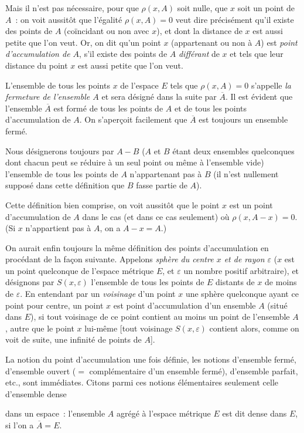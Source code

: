 \documentclass[a4paper,12pt]{amsart}
\newcommand{\srcpage}[1]{} %
\begin{document}
Mais il n'est pas nécessaire, pour que $\rho(x,A)$ soit nulle, que $x$ soit un point de $A$~: on voit aussitôt que l'égalité $\rho(x,A)=0$ veut dire précisément qu'il existe des points de $A$ (coïncidant ou non avec $x$), et dont la distance de $x$ est aussi petite que l'on veut. Or, on dit qu'un point $x$ (appartenant ou non à $A$) est \textit{point d'accumulation de $A$}, s'il existe des points de $A$ \textit{différant} de $x$ et tels que leur distance du point $x$ est aussi petite que l'on veut.

L'ensemble de tous les points $x$ de l'espace $E$ tels que $\rho(x,A)=0$ s'appelle \textit{la fermeture de l'ensemble $A$} et sera désigné dans la suite par $\overline{A}$. Il est évident que l'ensemble $\overline{A}$ est formé de tous les points de $A$ et de tous les points d'accumulation de $A$. On s'aperçoit facilement que $\overline{A}$ est toujours un ensemble fermé.

Nous désignerons toujours par $A-B$ ($A$ et $B$ étant deux ensembles quelconques dont chacun peut se réduire à un seul point ou même à l'ensemble vide) l'ensemble de tous les points de $A$ n'appartenant pas à $B$ (il n'est nullement supposé dans cette définition que $B$ fasse partie de $A$).

Cette définition bien comprise, on voit aussitôt que le point $x$ est un point d'accumulation de $A$ dans le cas (et dans ce cas seulement) où $\rho(x,A-x)=0$. (Si $x$ n'appartient pas à $A$, on a $A-x=A$.)

On aurait enfin toujours la même définition des points d'accumulation en procédant de la façon suivante. Appelons \textit{sphère du centre $x$ et de rayon $\varepsilon$} ($x$ est un point quelconque de l'espace métrique $E$, et $\varepsilon$ un nombre positif arbitraire), et désignons par $S(x,\varepsilon)$ l'ensemble de tous les points de $E$ distants de $x$ de moins de $\varepsilon$. En entendant par un \textit{voisinage} d'un point $x$ une sphère quelconque ayant ce point pour centre, un point $x$ est point d'accumulation d'un ensemble $A$ (situé dans $E$), si tout voisinage de ce point contient au moins un point de l'ensemble $A$, autre que le point $x$ lui-même [tout voisinage $S(x,\varepsilon)$ contient alors, comme on voit de suite, une infinité de points de $A$].

La notion du point d'accumulation une fois définie, les notions d'ensemble fermé, d'ensemble ouvert ($=$ complémentaire d'un ensemble fermé), d'ensemble parfait, etc., sont immédiates. Citons parmi ces notions élémentaires seulement celle d'ensemble dense
\srcpage{45}
dans un espace~: l'ensemble $A$ agrégé à l'espace métrique $E$ est dit dense dans $E$, si l'on a $\overline{A}=E$.
\end{document}
